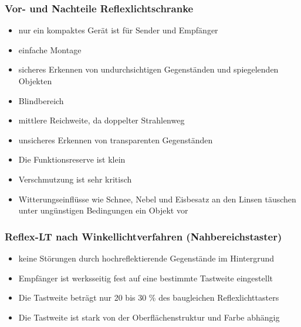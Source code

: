 \documentclass[a4paper]{scrartcl}
\begin{document}
\subsubsection{Vor- und Nachteile Reflexlichtschranke}
\begin{itemize}
\item nur ein kompaktes Gerät ist für Sender und Empfänger
\item einfache Montage
\item sicheres Erkennen von undurchsichtigen Gegenständen und spiegelenden Objekten
\item Blindbereich
\item mittlere Reichweite, da doppelter Strahlenweg
\item unsicheres Erkennen von transparenten Gegenständen
\item Die Funktionsreserve ist klein
\item Verschmutzung ist sehr kritisch
\item Witterungseinflüsse wie Schnee, Nebel und Eisbesatz an den Linsen täuschen unter ungünstigen Bedingungen ein Objekt vor
\end{itemize}

\subsubsection{Reflex-LT nach Winkellichtverfahren (Nahbereichstaster)}
\begin{itemize}
\item keine Störungen durch hochreflektierende Gegenstände im Hintergrund
\item Empfänger ist werksseitig fest auf eine bestimmte Tastweite eingestellt
\item Die Tastweite beträgt nur 20 bis 30 \% des baugleichen Reflexlichttasters
\item Die Tastweite ist stark von der Oberflächenstruktur und Farbe abhängig
\end{itemize}
\end{document}
